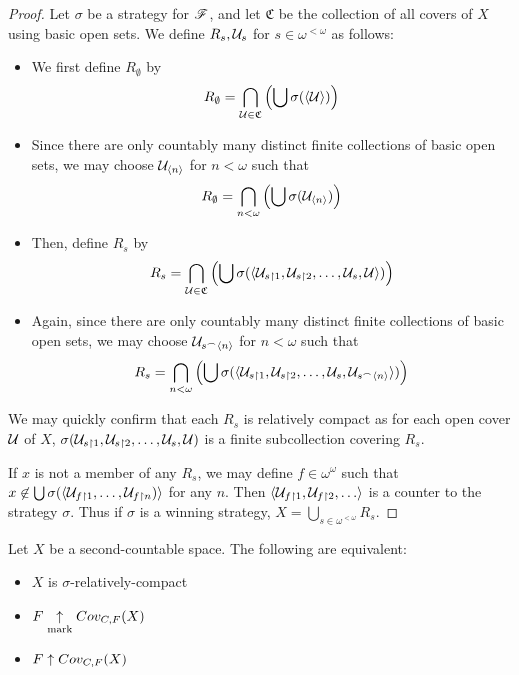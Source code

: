 \begin{proof}
  Let $\sigma$ be a strategy for $\mathscr{F}$, and let $\mathfrak{C}$ be the
  collection of all covers of $X$ using basic open sets. We define
  $R_s,\mathcal{U}_s$ for $s\in\omega^{<\omega}$ as follows:
    \begin{itemize}
      \item We first define $R_\emptyset$ by
        \[
          R_\emptyset
            =
          \bigcap_{\mathcal{U}\in\mathfrak{C}}
          \left(\bigcup \sigma(\langle\mathcal{U}\rangle)\right)
        \]
      \item Since there are only countably many distinct finite collections of
            basic open sets, we may choose $\mathcal{U}_{\langle n\rangle}$ for $n<\omega$ such
            that
        \[
          R_\emptyset
            =
          \bigcap_{n<\omega}
          \left(\bigcup\sigma(\mathcal{U}_{\langle n\rangle})\right)
        \]
      \item Then, define $R_{s}$ by
        \[
          R_s
            =
          \bigcap_{\mathcal{U}\in\mathfrak{C}}
          \left(\bigcup
            \sigma(\langle\mathcal{U}_{s\restriction1},\mathcal{U}_{s\restriction2},\dots,\mathcal{U}_s,\mathcal{U}\rangle)
          \right)
        \]
      \item Again, since there are only countably many distinct finite
            collections of basic open sets, we may choose
            $\mathcal{U}_{s{^\frown}\langle n\rangle}$ for $n<\omega$ such that
        \[
          R_s
            =
          \bigcap_{n<\omega}
          \left(\bigcup
            \sigma(\langle\mathcal{U}_{s\restriction1},\mathcal{U}_{s\restriction2},\dots,
                     \mathcal{U}_s,\mathcal{U}_{s{^\frown}\langle n\rangle}\rangle)
          \right)
        \]
    \end{itemize}

    We may quickly confirm that each $R_s$ is relatively compact as for each
    open cover $\mathcal{U}$ of $X$,
    $\sigma(\mathcal{U}_{s\restriction1},\mathcal{U}_{s\restriction2},\dots,\mathcal{U}_s,\mathcal{U})$ is
    a finite subcollection covering $R_s$.

    If $x$ is not a member of any $R_s$, we may define $f\in\omega^\omega$ such
    that $x\not\in \bigcup\sigma(\langle\mathcal{U}_{f\restriction1},\dots,\mathcal{U}_{f\restriction n})\rangle$
    for any $n$. Then $\<\mc{U}_{f\rest1},\mc{U}_{f\rest2},\dots\>$ is a
    counter to the strategy $\sigma$. Thus if $\sigma$ is a winning
    strategy, $X = \bigcup_{s\in\omega^{<\omega}} R_s$.
\end{proof}

\begin{cor}
  Let $X$ be a second-countable space. The following are equivalent:
  \begin{itemize}
    \item $X$ is $\sigma$-relatively-compact
    \item $F \underset{\text{mark}}{\uparrow} Cov_{C,F}(X)$
    \item $F \uparrow Cov_{C,F}(X)$
  \end{itemize}
\end{cor}

